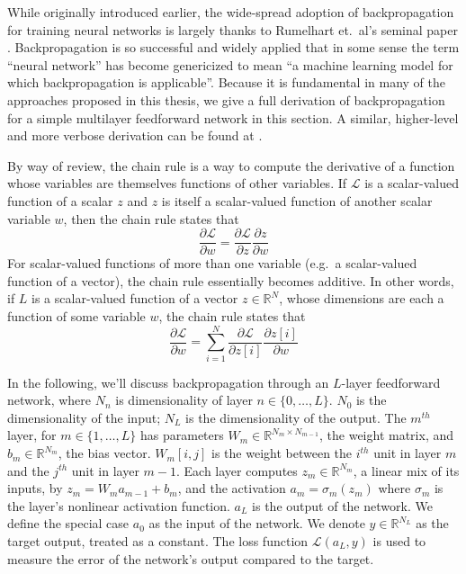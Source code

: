 While originally introduced earlier, the wide-spread adoption of backpropagation for training neural networks is largely thanks to Rumelhart et.\ al's seminal paper \cite{}.
Backpropagation is so successful and widely applied that in some sense the term ``neural network'' has become genericized to mean ``a machine learning model for which backpropagation is applicable''.
Because it is fundamental in many of the approaches proposed in this thesis, we give a full derivation of backpropagation for a simple multilayer feedforward network in this section.
A similar, higher-level and more verbose derivation can be found at \cite{}.

By way of review, the chain rule is a way to compute the derivative of a function whose variables are themselves functions of other variables.
If $\mathcal{L}$ is a scalar-valued function of a scalar $z$ and $z$ is itself a scalar-valued function of another scalar variable $w$, then the chain rule states that
\begin{equation}
\frac{\partial \mathcal{L}}{\partial w} = \frac{\partial \mathcal{L}}{\partial z}\frac{\partial z}{\partial w}
\end{equation}
For scalar-valued functions of more than one variable (e.g.\ a scalar-valued function of a vector), the chain rule essentially becomes additive.
In other words, if $L$ is a scalar-valued function of a vector $z \in \mathbb{R}^N$, whose dimensions are each a function of some variable $w$, the chain rule states that
\begin{equation}
\frac{\partial \mathcal{L}}{\partial w} = \sum_{i = 1}^N \frac{\partial \mathcal{L}}{\partial z[i]}\frac{\partial z[i]}{\partial w}
\end{equation}

In the following, we'll discuss backpropagation through an $L$-layer feedforward network, where $N_n$ is dimensionality of layer $n \in \{0, \ldots, L\}$.
$N_0$ is the dimensionality of the input; $N_L$ is the dimensionality of the output.
The $m^{th}$ layer, for $m \in \{1, \ldots, L\}$ has parameters $W_m \in \mathbb{R}^{N_m \times N_{m - 1}}$, the weight matrix, and $b_m \in \mathbb{R}^{N_m}$, the bias vector.
$W_m[i, j]$ is the weight between the $i^{th}$ unit in layer $m$ and the $j^{th}$ unit in layer $m - 1$.
Each layer computes $z_m \in \mathbb{R}^{N_m}$, a linear mix of its inputs, by $z_m = W_m a_{m - 1} + b_m$, and the activation $a_m = \sigma_m(z_m)$ where $\sigma_m$ is the layer's nonlinear activation function.
$a_L$ is the output of the network.
We define the special case $a_0$ as the input of the network.
We denote $y \in \mathbb{R}^{N_L}$ as the target output, treated as a constant.
The loss function $\mathcal{L}(a_L, y)$ is used to measure the error of the network's output compared to the target.

